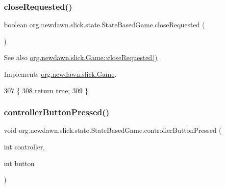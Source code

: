 \subsubsection{\texorpdfstring{close\+Requested()}{closeRequested()}}
{\footnotesize\ttfamily boolean org.\+newdawn.\+slick.\+state.\+State\+Based\+Game.\+close\+Requested (\begin{DoxyParamCaption}{ }\end{DoxyParamCaption})\hspace{0.3cm}{\ttfamily [inline]}}

\begin{DoxySeeAlso}{See also}
\mbox{\hyperlink{interfaceorg_1_1newdawn_1_1slick_1_1_game_a186989e6f05f917447c004adfe2f2332}{org.\+newdawn.\+slick.\+Game\+::close\+Requested()}} 
\end{DoxySeeAlso}


Implements \mbox{\hyperlink{interfaceorg_1_1newdawn_1_1slick_1_1_game_a186989e6f05f917447c004adfe2f2332}{org.\+newdawn.\+slick.\+Game}}.


\begin{DoxyCode}
307                                     \{
308         \textcolor{keywordflow}{return} \textcolor{keyword}{true};
309     \}
\end{DoxyCode}
\mbox{\label{classorg_1_1newdawn_1_1slick_1_1state_1_1_state_based_game_a86b1ef633750d400262209bd8d6c2059}} 
\subsubsection{\texorpdfstring{controller\+Button\+Pressed()}{controllerButtonPressed()}}
{\footnotesize\ttfamily void org.\+newdawn.\+slick.\+state.\+State\+Based\+Game.\+controller\+Button\+Pressed (\begin{DoxyParamCaption}\item[{int}]{controller,  }\item[{int}]{button }\end{DoxyParamCaption})\hspace{0.3cm}{\ttfamily [inline]}}


